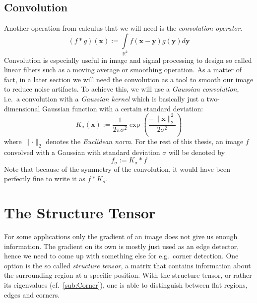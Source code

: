 \subsection{Convolution}
Another operation from calculus that we will need is the \textit{convolution operator}.\\
\begin{equation}
    (f * g)(\boldsymbol x) := \int\limits_{\mathbb{R}^2} f(\boldsymbol x-\boldsymbol y)g(\boldsymbol y)d\boldsymbol y\label{eq:2DConv}
\end{equation}
Convolution is especially useful in image and signal processing to design so called linear filters
such as a moving average or smoothing operation\cite{ipcv19-02,dic18-02}. As a matter of fact, in a later
section we will need the convolution as a tool to smooth our image to reduce noise artifacts. To
achieve this, we will use a \textit{Gaussian convolution}, i.e.\ a convolution with a
\textit{Gaussian kernel} which is basically just a two-dimensional Gaussian function with a certain
standard deviation\cite{ipcv19-02}:
\begin{equation}
    K_\sigma (\boldsymbol x) := \frac{1}{2\pi\sigma^2}\exp\left(\frac{-\lVert\boldsymbol
            x\rVert_2^2}{2\sigma^2}\right)
\end{equation}
where $\lVert \cdot \rVert_2$ denotes the \textit{Euclidean norm}.
For the rest of this thesis, an image $f$ convolved with a Gaussian with standard deviation $\sigma$
will be denoted by \[f_\sigma := K_\sigma * f\]
Note that because of the symmetry of the
convolution, it would have been perfectly fine to write it as $f * K_\sigma$.

\section{The Structure Tensor}\label{sec:Structure}
For some applications only the gradient of an image does not give us enough information. The
gradient on its own is mostly just used as an edge detector, hence we need to come up with
something else for e.g.\ corner detection\cite{ipcv19-13}. One option is the so called \textit{structure tensor}, a
matrix that contains information about the surrounding region at a specific position. With the
structure tensor, or rather its eigenvalues (cf.~\ref{sub:Corner}), one is able to
distinguish between flat regions, edges and corners.

